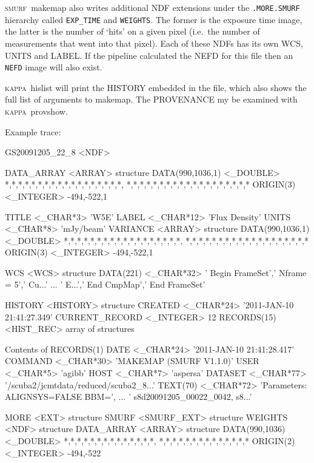 \documentclass[twoside,11pt,nolof]{starlink}
\providecommand{\KAPPA}{\textsc{kappa}}
\providecommand{\SMURF}{\textsc{smurf}}
\providecommand{\task}[1]{\textsf{#1}}
\begin{document}
\SMURF\ \task{makemap} also writes additional NDF extensions under the
\verb+.MORE.SMURF+ hierarchy called \verb+EXP_TIME+ and
\verb+WEIGHTS+. The former is the exposure time image, the latter is
the number of `hits' on a given pixel (i.e.\ the number of
measurements that went into that pixel). Each of these NDFs has its
own WCS, UNITS and LABEL. If the pipeline calculated the NEFD for this
file then an \verb+NEFD+ image will also exist.

\KAPPA\ \task{hislist} will print the HISTORY embedded in the file,
which also shows the full list of arguments to \task{makemap}. The
PROVENANCE my be examined with \KAPPA\ \task{provshow}.

Example trace:
\begin{terminalv}
GS20091205_22_8  <NDF>

   DATA_ARRAY     <ARRAY>         {structure}
      DATA(990,1036,1)  <_DOUBLE>    *,*,*,*,*,*,*,*,*,*,*,*,*,*,*,*,*,*,
                                     *,*,*,*,*,*,*,*,*,*,*,*,*,*,*,*,*,*,*
      ORIGIN(3)      <_INTEGER>      -494,-522,1

   TITLE          <_CHAR*3>       'W5E'
   LABEL          <_CHAR*12>      'Flux Density'
   UNITS          <_CHAR*8>       'mJy/beam'
   VARIANCE       <ARRAY>         {structure}
      DATA(990,1036,1)  <_DOUBLE>    *,*,*,*,*,*,*,*,*,*,*,*,*,*,*,*,*,*,
                                     *,*,*,*,*,*,*,*,*,*,*,*,*,*,*,*,*,*,*
      ORIGIN(3)      <_INTEGER>      -494,-522,1

   WCS            <WCS>           {structure}
      DATA(221)      <_CHAR*32>      ' Begin FrameSet',' Nframe = 5',' Cu...'
                                     ... ' E...',' End CmpMap',' End
FrameSet'

   HISTORY        <HISTORY>       {structure}
      CREATED        <_CHAR*24>      '2011-JAN-10 21:41:27.349'
      CURRENT_RECORD  <_INTEGER>     12
      RECORDS(15)    <HIST_REC>      {array of structures}

      Contents of RECORDS(1)
         DATE           <_CHAR*24>      '2011-JAN-10 21:41:28.417'
         COMMAND        <_CHAR*30>      'MAKEMAP         (SMURF V1.1.0)'
         USER           <_CHAR*5>       'agibb'
         HOST           <_CHAR*7>       'aspersa'
         DATASET        <_CHAR*77>
'/scuba2/jcmtdata/reduced/scuba2_8...'
         TEXT(70)       <_CHAR*72>      'Parameters: ALIGNSYS=FALSE BBM=',
                                        ... '   s8d20091205_00022_0042,
s8...'

   MORE           <EXT>           {structure}
      SMURF          <SMURF_EXT>     {structure}
         WEIGHTS        <NDF>           {structure}
            DATA_ARRAY     <ARRAY>         {structure}
               DATA(990,1036)  <_DOUBLE>      *,*,*,*,*,*,*,*,*,*,*,*,*,*,
                                              *,*,*,*,*,*,*,*,*,*,*,*,*,*
               ORIGIN(2)      <_INTEGER>      -494,-522


\end{terminalv}
\end{document}
